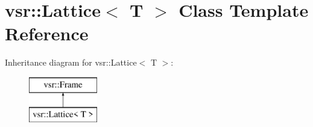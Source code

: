 \hypertarget{classvsr_1_1_lattice}{\section{vsr\-:\-:Lattice$<$ T $>$ Class Template Reference}
\label{classvsr_1_1_lattice}
}
Inheritance diagram for vsr\-:\-:Lattice$<$ T $>$\-:\begin{figure}[H]
\begin{center}
\leavevmode
\includegraphics[height=2.000000cm]{classvsr_1_1_lattice}
\end{center}
\end{figure}
